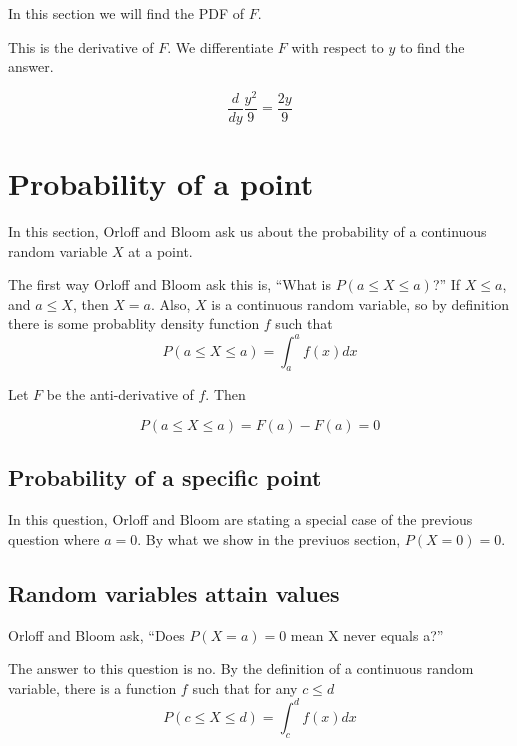 \documentclass[a4paper,11pt]{article}
\begin{document}
In this section we will find the PDF of $F$.

This is the derivative of $F$.  We differentiate $F$ with respect to $y$ to
find the answer.

\begin{equation}
  \frac{d}{dy} \frac{y^2}{9} = \frac{2 y}{9}
\end{equation}

\section{Probability of a point}
In this section, Orloff and Bloom ask us about the probability of a
continuous random variable $X$ at a point.

The first way Orloff and Bloom ask this is,
``What is $P \left( a \leq X \leq a \right)$?''  If $X \leq a$, and $a \leq X$,
then $X=a$. Also, $X$ is a continuous random variable, so by definition
\cite{reading5b} there is some probablity density function $f$ such that
\begin{equation}
  P \left(a \leq X \leq a \right) = \int_{a}^{a} f\left(x \right) dx
\end{equation}

Let $F$ be the anti-derivative of $f$.  Then

\begin{equation}
  P \left(a \leq X \leq a \right) = F \left(a \right)  - F \left( a \right) = 0
\end{equation}

\subsection{ Probability of a specific point}
In this question, Orloff and Bloom are stating a special case of the previous
question where $a=0$.   By what we show in the previuos section,
$P\left(X=0 \right) = 0$.

\subsection{Random variables attain values}

Orloff and Bloom ask, ``Does $P \left(X = a \right) = 0$ mean X never equals
a?''

The answer to this question is no.  By the definition of a continuous random
variable, there is a function $f$ such that for any $c \leq d$
\begin{equation}
  P \left( c \leq X \leq d \right) = \int_{c}^{d} f \left(x \right) dx
\end{equation}
\end{document}
